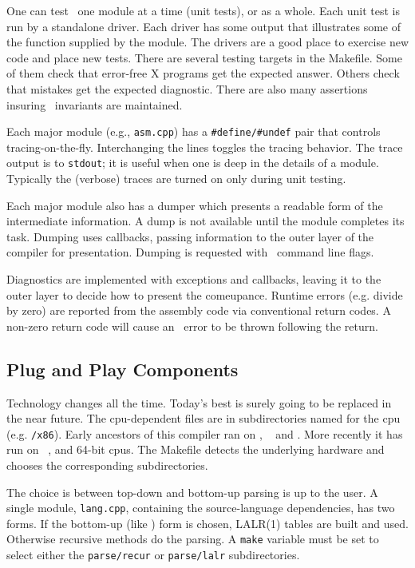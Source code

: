 One can test \xcom\ one module at a time (unit tests), or as a whole.  Each unit test is run by a standalone driver.  Each driver has some output that illustrates some of the function supplied by the module.  The drivers are a good place to exercise new code and place new tests.  There are several testing targets in the Makefile.  Some of them check that error-free X programs get the expected answer.  Others check that mistakes get the expected diagnostic.  There are also many assertions insuring \xcom\ invariants are maintained.

Each major module (e.g., {\tt asm.cpp}) has a {\tt \#define/\#undef} pair that controls tracing-on-the-fly.  Interchanging the lines toggles the tracing behavior.  The trace output is to {\tt stdout}; it is useful when one is deep in the details of a module.  Typically the (verbose) traces are turned on only during unit testing.

Each major module also has a dumper which presents a readable form of the intermediate information.  A dump is not available until the module completes its task.  Dumping uses callbacks, passing information to the outer layer of the compiler for presentation.  Dumping is requested with \xcom\ command line flags.

Diagnostics are implemented with exceptions and callbacks, leaving it to the outer layer to decide how to present the comeupance.  Runtime errors (e.g. divide by zero) are reported from the assembly code via conventional return codes.  A non-zero return code will cause an \xcom\ error to be thrown following the return.

\subsection{Plug and Play Components}

Technology changes all the time.  Today's best is surely going to be replaced in the near future.  The cpu-dependent files are in subdirectories named for the cpu (e.g. {\tt /x86}).  Early ancestors of this compiler ran on , \  and .  More recently it has run on \ ,  and  64-bit cpus.  The Makefile detects the underlying hardware and chooses the corresponding subdirectories.

The choice is between top-down and bottom-up parsing is up to the user.  A single module, {\tt lang.cpp}, containing the source-language dependencies, has two forms.  If the bottom-up (like ) form is chosen, LALR(1) tables are built and used.  Otherwise recursive methods do the parsing.  A {\tt make} variable must be set to select either the {\tt parse/recur} or {\tt parse/lalr} subdirectories.

